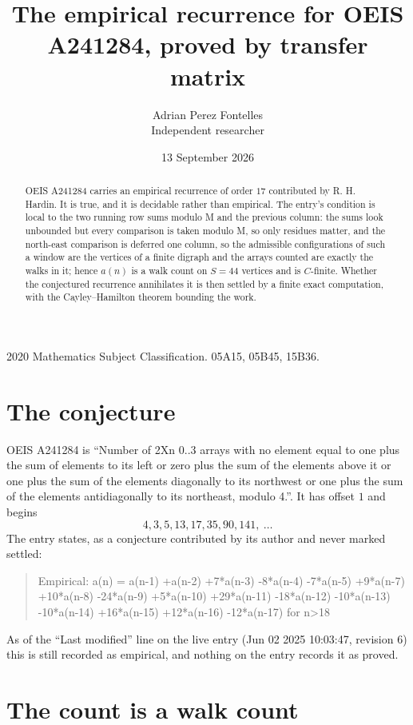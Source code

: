 \documentclass[11pt,a4paper]{article}
\title{The empirical recurrence for OEIS A241284, proved by transfer matrix}
\author{Adrian Perez Fontelles\\ \small Independent researcher}
\date{13 September 2026}
\theoremstyle{plain}
\theoremstyle{definition}
\begin{document}
\maketitle

\begin{abstract}
OEIS A241284 carries an empirical recurrence of order $17$ contributed by R. H. Hardin. It is
true, and it is decidable rather than empirical. The entry's condition is local to the two running row sums modulo M and the previous column: the sums look unbounded but every comparison is taken modulo M, so only residues matter, and the north-east comparison is deferred one column, so
the admissible configurations of such a window are the vertices of a finite digraph and the
arrays counted are exactly the walks in it; hence $a(n)$ is a walk count on $S=44$ vertices
and is $C$-finite. Whether the conjectured recurrence annihilates it is then settled by a
finite exact computation, with the Cayley--Hamilton theorem bounding the work.
\end{abstract}

\noindent\small 2020 Mathematics Subject Classification. 05A15, 05B45, 15B36.\normalsize

\section{The conjecture}

OEIS A241284 is ``Number of 2Xn 0..3 arrays with no element equal to one plus the sum of elements to its left or zero plus the sum of the elements above it or one plus the sum of the elements diagonally to its northwest or one plus the sum of the elements antidiagonally to its northeast, modulo 4.''. It has offset $1$ and begins
\[
4, 3, 5, 13, 17, 35, 90, 141,\ \dots
\]
The entry states, as a conjecture contributed by its author and never marked settled:
\begin{quote}
Empirical: a(n) = a(n-1) +a(n-2) +7*a(n-3) -8*a(n-4) -7*a(n-5) +9*a(n-7) +10*a(n-8) -24*a(n-9) +5*a(n-10) +29*a(n-11) -18*a(n-12) -10*a(n-13) -10*a(n-14) +16*a(n-15) +12*a(n-16) -12*a(n-17) for n>18
\end{quote}
As of the ``Last modified'' line on the live entry (Jun 02 2025 10:03:47, revision 6) this is still
recorded as empirical, and nothing on the entry records it as proved.

\section{The count is a walk count}
\end{document}
